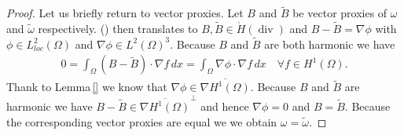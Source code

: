 \documentclass[12pt,a4paper]{article}
\theoremstyle{definition}
\DeclareMathOperator{\diver}{div}
\newcommand{\rop}{\mathscr{R}} %
\begin{document}
\begin{proof}
    Let us briefly return to vector proxies. Let $B$ and $\tilde{B}$ be 
    vector proxies of $\omega$ and $\tilde{\omega}$ respectively. 
    () then translates to 
    $B, \tilde{B} \in \mathring{H}(\diver)$ %
    and $B-\tilde{B} = \nabla \phi$ with $\phi \in L^2_{loc}(\Omega)$ and
    $\nabla \phi \in L^2(\Omega)^3$.
    Because $B$ and $\tilde{B}$ are both harmonic we have 
    \begin{align*}
        0 = \int_\Omega (B-\tilde{B}) \cdot \nabla f\, dx 
        = \int_\Omega \nabla \phi \cdot \nabla f \,dx
        \quad \forall 
        f \in H^1(\Omega).
    \end{align*}
    Thank to Lemma\,\ref{} we know that 
    $\nabla \phi \in \overline{\nabla H^1(\Omega)}$. 
    Because $B$ and $\tilde{B}$ are harmonic we have 
    $B - \tilde{B} \in 
    \overline{\nabla H^1(\Omega)}^\perp$ and hence $\nabla \phi = 0$
    and $B = \tilde{B}$. Because the corresponding vector proxies are equal we 
    we obtain $\omega = \tilde{\omega}$.
\end{proof}



    
\end{document}
